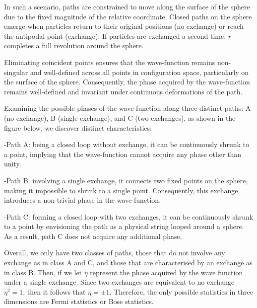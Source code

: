 \documentclass[12pt]{report}
\begin{document}
	\begin{minipage}{1 \textwidth}
		
		In such a scenario, paths are constrained to move along the surface of the sphere due to the fixed magnitude of the relative coordinate. Closed paths on the sphere emerge when particles return to their original positions (no exchange) or reach the antipodal point (exchange). If particles are exchanged a second time, $r$ completes a full revolution around the sphere. \newline
		
		Eliminating coincident points ensures that the wave-function remains non-singular and well-defined across all points in configuration space, particularly on the surface of the sphere. Consequently, the phase acquired by the wave-function remains well-defined and invariant under continuous deformations of the path.\newline
		
		Examining the possible phases of the wave-function along three distinct paths: A (no exchange), B (single exchange), and C (two exchanges), as shown in the figure below, we discover distinct characteristics: \newline
		
		-Path A: being a closed loop without exchange, it can be continuously shrunk to a point, implying that the wave-function cannot acquire any phase other than unity.\newline 
		
		-Path B: involving a single exchange, it connects two fixed points on the sphere, making it impossible to shrink to a single point. Consequently, this exchange introduces a non-trivial phase in the wave-function. \newline
		
		-Path C: forming a closed loop with two exchanges, it can be continuously shrunk to a point by envisioning the path as a physical string looped around a sphere. As a result, path C does not acquire any additional phase.\newline
		
		Overall, we only have two classes of paths, those that do not involve any exchange as in class A and C, and those that are characterised by an exchange as in class B.\newline
		Then, if we let $\eta$ represent the phase acquired by the wave function under a single exchange. Since two exchanges are equivalent to no exchange $\eta^2=1$, then it follows that $\eta = \pm 1 $. Therefore, the only possible statistics in three dimensions are Fermi statistics or Bose statistics.\newline
		

\end{minipage}
\end{document}
